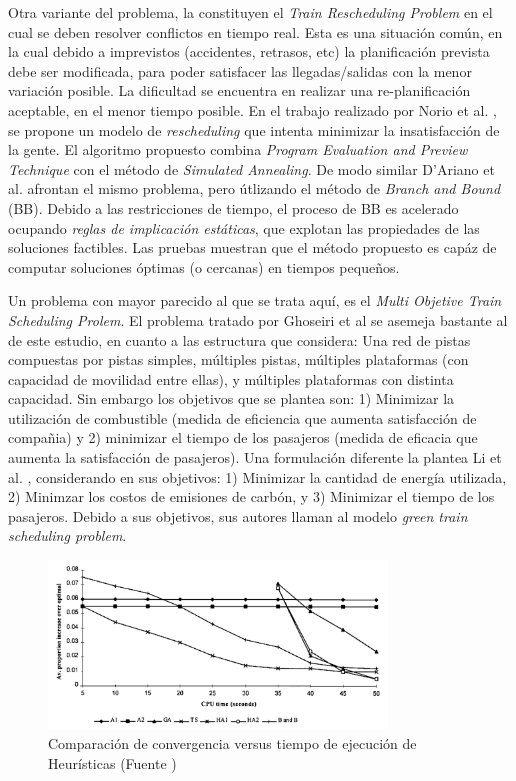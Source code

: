 \documentclass[letter, 10pt]{article}
\begin{document}
\begin{description}
	Otra variante del problema, la constituyen el \textit{Train Rescheduling Problem} en el cual se deben resolver conflictos en tiempo real. Esta es una situación común, en la cual debido a imprevistos (accidentes, retrasos, etc) la planificación prevista debe ser modificada, para poder satisfacer las llegadas/salidas con la menor variación posible. La dificultad se encuentra en realizar una re-planificación aceptable, en el menor tiempo posible. En el trabajo realizado por Norio et al. \cite{Norio}, se propone un modelo de \textit{rescheduling} que intenta minimizar la insatisfacción de la gente. El algoritmo propuesto combina \textit{Program Evaluation and Preview Technique} con el método de \textit{Simulated Annealing}. De modo similar D'Ariano et al. \cite{DAriano} afrontan el mismo problema, pero útlizando el método de \textit{Branch and Bound} (BB). Debido a las restricciones de tiempo, el proceso de BB es acelerado ocupando \textit{reglas de implicación estáticas}, que explotan las propiedades de las soluciones factibles. Las pruebas muestran que el método propuesto es capáz de computar soluciones óptimas (o cercanas) en tiempos pequeños.

	Un problema con mayor parecido al que se trata aquí, es el \textit{Multi Objetive Train Scheduling Prolem}. El problema tratado por Ghoseiri et al \cite{Ghoseiri} se asemeja bastante al de este estudio, en cuanto a las estructura que considera: Una red de pistas compuestas por pistas simples, múltiples pistas, múltiples plataformas (con capacidad de movilidad entre ellas), y múltiples plataformas con distinta capacidad. Sin embargo los objetivos que se plantea son: 1) Minimizar la utilización de combustible (medida de eficiencia que aumenta satisfacción de compañia) y 2) minimizar el tiempo de los pasajeros (medida de eficacia que aumenta la satisfacción de pasajeros). Una formulación diferente la plantea Li et al. \cite{Li}, considerando en sus objetivos: 1) Minimizar la cantidad de energía utilizada, 2) Minimzar los costos de emisiones de carbón, y 3) Minimizar el tiempo de los pasajeros. Debido a sus objetivos, sus autores llaman al modelo \textit{green train scheduling problem}.   

	\begin{figure}[htpb!]
	\centering
	\includegraphics[width=9cm]{timecomp}
	\caption{Comparación de convergencia versus tiempo de ejecución de Heurísticas (Fuente \cite{Higgins})}
	\label{fig:timecomp}
	\end{figure}
\end{description}
\end{document}
